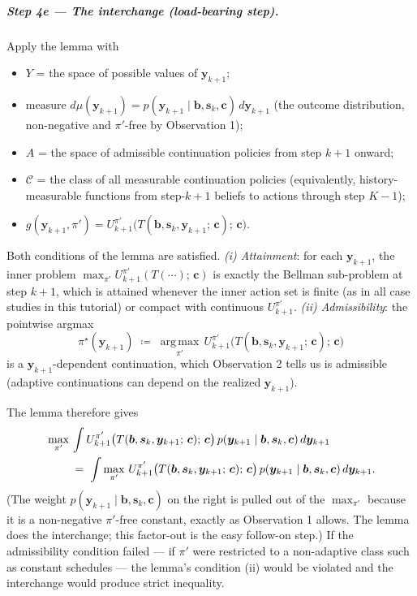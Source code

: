 \documentclass[11pt]{article}
\newcommand{\bc}{\bm{c}}
\newcommand{\by}{\bm{y}}
\newcommand{\bs}{\bm{s}}
\newcommand{\bb}{\bm{b}}
\newcommand{\argmax}{\operatorname*{arg\,max}}
\begin{document}
\subparagraph{Step 4e --- The interchange (load-bearing step).}  Apply the lemma with
\begin{itemize}[nosep, leftmargin=*]
\item $Y$ = the space of possible values of $\by_{k+1}$;
\item measure $d\mu(\by_{k+1}) = p(\by_{k+1} \mid \bb, \bs_k, \bc)\, d\by_{k+1}$ (the outcome distribution, non-negative and $\pi'$-free by Observation 1);
\item $A$ = the space of admissible continuation policies from step $k+1$ onward;
\item $\mathcal{C}$ = the class of all measurable continuation policies (equivalently, history-measurable functions from step-$k+1$ beliefs to actions through step $K-1$);
\item $g(\by_{k+1}, \pi') = U^{\pi'}_{k+1}\bigl(T(\bb, \bs_k, \by_{k+1};\, \bc);\, \bc\bigr)$.
\end{itemize}
Both conditions of the lemma are satisfied.  \emph{(i) Attainment}: for each $\by_{k+1}$, the inner problem $\max_{\pi'} U^{\pi'}_{k+1}(T(\cdots);\, \bc)$ is exactly the Bellman sub-problem at step $k+1$, which is attained whenever the inner action set is finite (as in all case studies in this tutorial) or compact with continuous $U^{\pi'}_{k+1}$.  \emph{(ii) Admissibility}: the pointwise argmax
\begin{equation*}
\pi^\star(\by_{k+1}) \;\coloneqq\; \argmax_{\pi'}\, U^{\pi'}_{k+1}\bigl(T(\bb, \bs_k, \by_{k+1};\, \bc);\, \bc\bigr)
\end{equation*}
is a $\by_{k+1}$-dependent continuation, which Observation 2 tells us is admissible (adaptive continuations can depend on the realized $\by_{k+1}$).

The lemma therefore gives
\begin{align}
&\max_{\pi'}\, \int U^{\pi'}_{k+1}\bigl(T(\bb, \bs_k, \by_{k+1};\, \bc);\, \bc\bigr)\, p(\by_{k+1} \mid \bb, \bs_k, \bc)\, d\by_{k+1} \notag \\
&\qquad\;=\; \int \max_{\pi'}\, U^{\pi'}_{k+1}\bigl(T(\bb, \bs_k, \by_{k+1};\, \bc);\, \bc\bigr)\, p(\by_{k+1} \mid \bb, \bs_k, \bc)\, d\by_{k+1}.
\label{eq:interchange}
\end{align}
(The weight $p(\by_{k+1} \mid \bb, \bs_k, \bc)$ on the right is pulled out of the $\max_{\pi'}$ because it is a non-negative $\pi'$-free constant, exactly as Observation 1 allows.  The lemma does the interchange; this factor-out is the easy follow-on step.)  If the admissibility condition failed --- if $\pi'$ were restricted to a non-adaptive class such as constant schedules --- the lemma's condition (ii) would be violated and the interchange would produce strict inequality.
\end{document}
